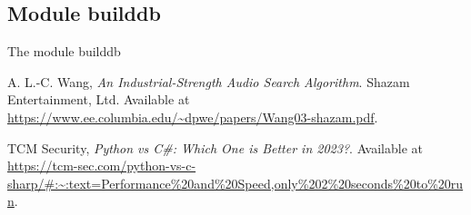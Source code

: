 \documentclass[11pt, a4paper]{article}
\begin{document}
    \subsection{Module builddb}

    The module builddb 

    \begin{list}

    \end{list}



    \newpage

    \begin{thebibliography}{11}

    A. L.-C. Wang, \textit{An Industrial-Strength Audio Search Algorithm}.  
    Shazam Entertainment, Ltd.  
    Available at \url{https://www.ee.columbia.edu/~dpwe/papers/Wang03-shazam.pdf}.

    TCM Security, \textit{Python vs C#: Which One is Better in 2023?}.  
    Available at \url{https://tcm-sec.com/python-vs-c-sharp/#:~:text=Performance%20and%20Speed,only%202%20seconds%20to%20run}.

    \end{thebibliography}
\end{document}
